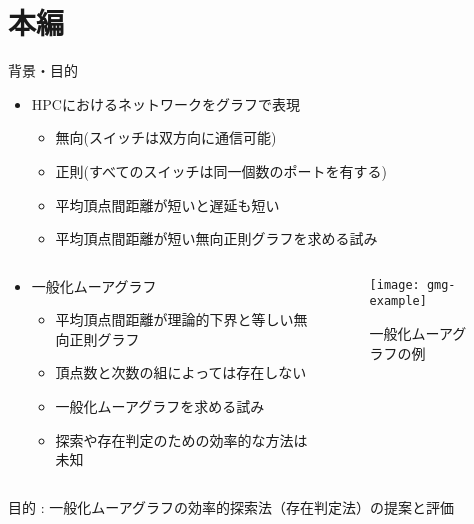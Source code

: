 
\begin{frame}
  \maketitle
\end{frame}

\section{本編}
\begin{frame}{背景・目的}
  \begin{itemize}
  \item HPCにおけるネットワークをグラフで表現
    \begin{itemize}
    \item 無向(スイッチは双方向に通信可能)
    \item 正則(すべてのスイッチは同一個数のポートを有する)
    \item 平均頂点間距離が短いと遅延も短い
      \cite{Koibuchi2012,Singla2011}
    \item 平均頂点間距離が短い無向正則グラフを求める試み
      \cite{Fujita2015}
    \end{itemize}
  \end{itemize}
  \vspace{-1em}
  \begin{columns}[T]
    \begin{column}{.5\textwidth}
      \begin{itemize}
      \item \alert{一般化ムーアグラフ}
        \begin{itemize}
        \item 平均頂点間距離が理論的下界と等しい無向正則グラフ
          \cite{Cerf1973,Cerf1974Lower}
        \item 頂点数と次数の組によっては存在しない
        \item 一般化ムーアグラフを求める試み
          \cite{Yamamoto2016}
        \item 探索や存在判定のための効率的な方法は未知
        \end{itemize}
      \end{itemize}
    \end{column}
    \begin{column}{.5\textwidth}
      \begin{figure}
        \texttt{[image: gmg-example]}
        \caption{一般化ムーアグラフの例}
        \label{fig:gmg-example}
      \end{figure}
    \end{column}
  \end{columns}
  \begin{block}{}
    目的 : 一般化ムーアグラフの効率的探索法（存在判定法）の提案と評価
  \end{block}
\end{frame}

